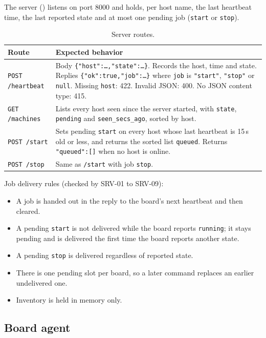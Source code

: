 \documentclass[11pt]{article}
\begin{document}
The server () listens on port 8000 and holds, per host name, the last heartbeat time, the last reported state and at most one pending job (\texttt{start} or \texttt{stop}).

\begin{table}[H]
  \centering
  \footnotesize
  \begin{tabularx}{\textwidth}{@{}l X@{}}
    \toprule
    \textbf{Route} & \textbf{Expected behavior} \\
    \midrule
    \texttt{POST /heartbeat} &
    Body \texttt{\{"host":\ldots,"state":\ldots\}}. Records the host, time and state. Replies \texttt{\{"ok":true,"job":\ldots\}} where \texttt{job} is \texttt{"start"}, \texttt{"stop"} or \texttt{null}. Missing \texttt{host}: 422. Invalid JSON: 400. No JSON content type: 415. \\
    \texttt{GET /machines} &
    Lists every host seen since the server started, with \texttt{state}, \texttt{pending} and \texttt{seen\_secs\_ago}, sorted by host. \\
    \texttt{POST /start} &
    Sets pending \texttt{start} on every host whose last heartbeat is 15\,s old or less, and returns the sorted list \texttt{queued}. Returns \texttt{"queued":[]} when no host is online. \\
    \texttt{POST /stop} &
    Same as \texttt{/start} with job \texttt{stop}. \\
    \bottomrule
  \end{tabularx}
  \caption{Server routes.}
  \label{tab:routes}
\end{table}

Job delivery rules (checked by SRV-01 to SRV-09):
\begin{itemize}\setlength{\itemsep}{0.12em}
  \item A job is handed out in the reply to the board's next heartbeat and then cleared.
  \item A pending \texttt{start} is not delivered while the board reports \texttt{running}; it stays pending and is delivered the first time the board reports another state.
  \item A pending \texttt{stop} is delivered regardless of reported state.
  \item There is one pending slot per board, so a later command replaces an earlier undelivered one.
  \item Inventory is held in memory only.
\end{itemize}

\subsection{Board agent}
\end{document}
